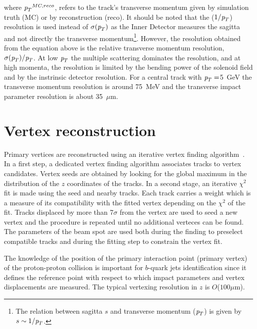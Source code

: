 where ${\emph{p}_{T}}^{MC,reco}$, refers to the track's transverse momentum given by simulation truth (MC) or by reconstruction (reco). It should be noted that the ($1/{\emph{p}_{T}}$) resolution is used instead of $\sigma({\emph{p}_{T}})$ as the Inner Detector measures the sagitta and not directly the transverse momentum\footnote{The relation between sagitta $s$ and transverse momentum (${\emph{p}_{T}}$) is given by $s \sim  1/{\emph{p}_{T}}$. }.  However, the resolution obtained from the equation above is the relative transverse momentum resolution,  $\sigma({\emph{p}_{T}}) / {\emph{p}_{T}}$. At low ${\emph{p}_{T}}$ the multiple scattering dominates the resolution, and at high momenta, the resolution is limited by the bending power of the solenoid field and by the instrinsic detector resolution.  For a central track with ${\emph{p}_{T}}=$5~GeV %
the transverse momentum resolution is around 75~MeV and the transverse impact parameter resolution is about 35~$\mu$m.



\section{Vertex reconstruction}\label{sec:trackreco}

Primary vertices are reconstructed using an iterative vertex finding algorithm~\cite{ATLAS-CONF-2010-069}. In a first step, a dedicated vertex finding algorithm associates tracks to vertex candidates. Vertex seeds are obtained by looking for the global maximum in the distribution of the $z$ coordinates of the tracks. In a second stage, an iterative $\chi^2$ fit is made using the seed and nearby tracks. Each track carries a weight which is a measure of its compatibility with the fitted vertex depending on the $\chi^2$ of the fit. Tracks displaced by more than 7$\sigma$ from the vertex are used to seed a new vertex and the procedure is repeated until no additional verteces can be found.  %
The parameters of the beam spot are used both during the finding to preselect compatible tracks and during the fitting step to constrain the vertex fit.


The knowledge of the position of the primary interaction point (primary vertex) of the proton-proton collision is important for $b$-quark jets identification since it defines the reference point with respect to which impact parameters and vertex displacements are measured.  The typical vertexing resolution in $z$ is $O$($100 \mu$m).


